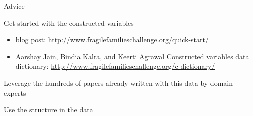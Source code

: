 \documentclass{beamer}
\begin{document}
\begin{frame}

\begin{center}
\LARGE{Advice}
\end{center}

\end{frame}
\begin{frame}

Get started with the constructed variables
\begin{itemize}
\item blog post: \small{\url{http://www.fragilefamilieschallenge.org/quick-start/}}
\item Aarshay Jain, Bindia Kalra, and Keerti Agrawal Constructed variables data dictionary: \small{\url{http://www.fragilefamilieschallenge.org/c-dictionary/}}
\end{itemize}

\end{frame}
\begin{frame}

\begin{center}
\Large{Leverage the hundreds of papers already written with this data by domain experts}
\end{center}

\end{frame}
\begin{frame}

\begin{center}
\Large{Use the structure in the data}
\end{center}

\end{frame}
\end{document}
